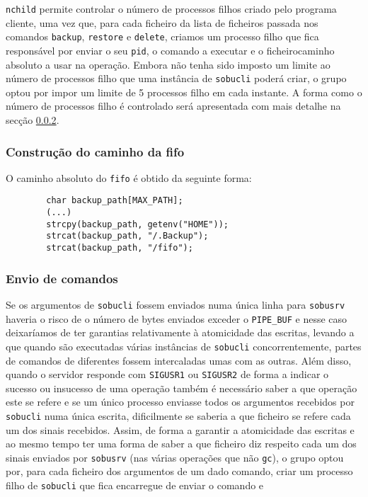 \documentclass[a4paper,12pt,titlepage,draft,portuguese]{article}
\begin{document}
\texttt{nchild} permite controlar o número de processos filhos criado pelo programa cliente, uma vez que, para cada ficheiro da lista de ficheiros passada nos comandos \texttt{backup}, \texttt{restore} e \texttt{delete}, criamos um processo filho que fica responsável por enviar o seu \texttt{pid}, o comando a executar e o ficheiro\/caminho absoluto a usar na operação. Embora não tenha sido imposto um limite ao número de processos filho que uma instância de \texttt{sobucli} poderá criar, o grupo optou por impor um limite de 5 processos filho em cada instante. A forma como o número de processos filho é controlado será apresentada com mais detalhe na secção \ref{Envio de comandos}.

\subsubsection{Construção do caminho da fifo}

O caminho absoluto do \texttt{fifo} é obtido da seguinte forma:
	\begin{verbatim}
		char backup_path[MAX_PATH];
		(...)
		strcpy(backup_path, getenv("HOME"));
		strcat(backup_path, "/.Backup");
		strcat(backup_path, "/fifo");
	\end{verbatim}

\subsubsection{Envio de comandos} \label{Envio de comandos}

Se os argumentos de \texttt{sobucli} fossem enviados numa única linha para \texttt{sobusrv} haveria o risco de o número de bytes enviados exceder o \texttt{PIPE\_BUF} e nesse caso deixaríamos de ter garantias relativamente à atomicidade das escritas, levando a que quando são executadas várias instâncias de \texttt{sobucli} concorrentemente, partes de comandos de diferentes fossem intercaladas umas com as outras. Além disso, quando o servidor responde com \texttt{SIGUSR1} ou \texttt{SIGUSR2} de forma a indicar o sucesso ou insucesso de uma operação também é necessário saber a que operação este se refere e se um único processo enviasse todos os argumentos recebidos por \texttt{sobucli} numa única escrita, dificilmente se saberia a que ficheiro se refere cada um dos sinais recebidos. Assim, de forma a garantir a atomicidade das escritas e ao mesmo tempo ter uma forma de saber a que ficheiro diz respeito cada um dos sinais enviados por \texttt{sobusrv} (nas várias operações que não \texttt{gc}), o grupo optou por, para cada ficheiro dos argumentos de um dado comando, criar um processo filho de \texttt{sobucli} que fica encarregue de enviar o comando e 
\end{document}

